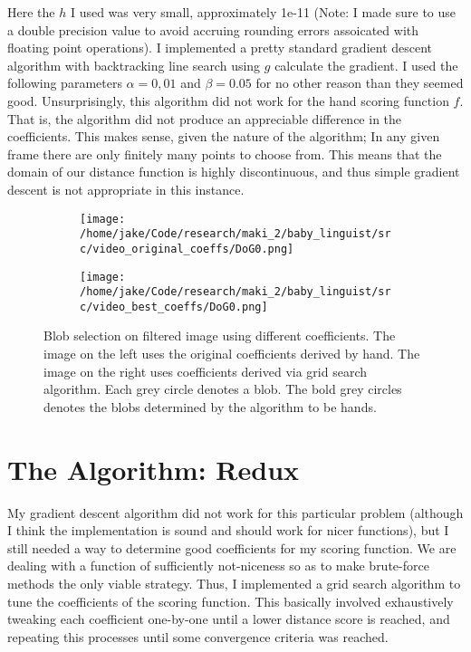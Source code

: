\documentclass[11pt]{article}
\begin{document}
Here the \(h\)  I used was very small, approximately 1e-11 (Note: I made sure to use a double precision value to avoid accruing rounding errors assoicated with floating point operations). I implemented a pretty standard gradient descent algorithm with backtracking line search using \(g\) calculate the gradient. I used the following parameters \(\alpha = 0,01\) and \(\beta = 0.05\) for no other reason than they seemed good. Unsurprisingly, this algorithm did not work for the hand scoring function \(f\). That is, the algorithm did not produce an appreciable difference in the coefficients. This makes sense, given the nature of the algorithm; In any given frame there are only finitely many points to choose from. This means that the domain of our distance function is highly discontinuous, and thus simple gradient descent is not appropriate in this instance. 



\begin{figure}
\centering
\begin{subfigure}{\textwidth}
  \centering
  \texttt{[image: /home/jake/Code/research/maki\_2/baby\_linguist/src/video\_original\_coeffs/DoG0.png]}
  \label{fig:sub1}
\end{subfigure}%
\begin{subfigure}{\textwidth}
  \centering
  \texttt{[image: /home/jake/Code/research/maki\_2/baby\_linguist/src/video\_best\_coeffs/DoG0.png]}
  \label{fig:sub2}
\end{subfigure}
\caption{Blob selection on filtered image using different coefficients. The image on the left uses the original coefficients derived by hand. The image on the right uses coefficients derived via grid search algorithm. Each grey circle denotes a blob. The bold grey circles denotes the blobs determined by the algorithm to be hands.}
\label{fig:test}
\end{figure}

\section{The Algorithm: Redux}
\label{sec:org97f377b}

My gradient descent algorithm did not work for this particular problem (although I think the implementation is sound and should work for nicer functions), but I still needed a way to determine good coefficients for my scoring function. We are dealing with a function of sufficiently not-niceness so as to make brute-force methods the only viable strategy. Thus, I implemented a grid search algorithm to tune the coefficients of the scoring function. This basically involved exhaustively tweaking each coefficient one-by-one until a lower distance score is reached, and repeating this processes until some convergence criteria was reached.
\end{document}
